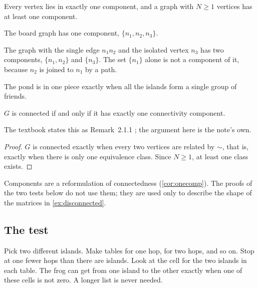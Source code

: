 \begin{remark}
Every vertex lies in exactly one component, and a graph with $N\ge 1$
vertices has at least one component.
\end{remark}
\begin{example}
The board graph has one component, $\{n_1,n_2,n_3\}$.
\end{example}
\begin{nonexample}
The graph with the single edge $n_1n_2$ and the isolated vertex $n_3$ has
two components, $\{n_1,n_2\}$ and $\{n_3\}$. The set $\{n_1\}$ alone is not
a component of it, because $n_2$ is joined to $n_1$ by a path.
\end{nonexample}

\plainwords{} The pond is in one piece exactly when all the islands form a
single group of friends.

\begin{corollary}\label{cor:onecomp}
$G$ is connected if and only if it has exactly one connectivity component.
\end{corollary}
The textbook states this as Remark~2.1.1
\cite[p.~49]{petrosyan2015graphs}; the argument here is the note's own.
\begin{proof}
$G$ is connected exactly when every two vertices are related by $\sim$,
that is, exactly when there is only one equivalence class. Since $N\ge 1$,
at least one class exists.
\end{proof}

Components are a reformulation of connectedness (\cref{cor:onecomp}). The
proofs of the two tests below do not use them; they are used only to
describe the shape of the matrices in \cref{ex:disconnected}.

\subsection{The test}

\plainwords{} Pick two different islands. Make tables for one hop, for two
hops, and so on. Stop at one fewer hops than there are islands. Look at the
cell for the two islands in each table. The frog can get from one island to
the other exactly when one of these cells is not zero. A longer list is
never needed.

